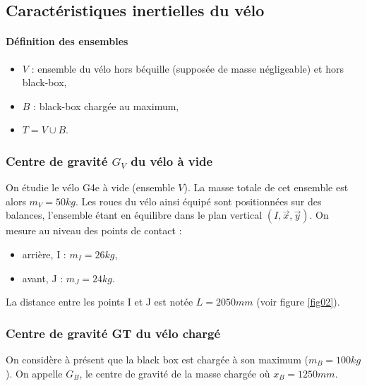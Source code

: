 \subsection{Caractéristiques inertielles du vélo}

\paragraph{Définition des ensembles}
\begin{itemize}
 \item $V$ : ensemble du vélo hors béquille (supposée de masse négligeable) et hors black-box,
 \item $B$ : black-box chargée au maximum,
 \item $T =V \cup B$.
\end{itemize}

\subsubsection{Centre de gravité $G_V$ du vélo à vide}

On étudie le vélo G4e à vide (ensemble $V$). La masse totale de cet ensemble est alors $m_V = 50 kg$. Les roues du vélo ainsi équipé sont positionnées sur des balances, l'ensemble étant en équilibre dans le plan vertical $(I,\vec{x},\vec{y})$. On mesure au niveau des points de contact :
\begin{itemize}
 \item arrière, I : $m_I = 26 kg$,
 \item avant, J : $m_J = 24 kg$.
\end{itemize}

La distance entre les points I et J est notée $L = 2050 mm$ (voir figure \ref{fig02}).


\subsubsection{Centre de gravité GT du vélo chargé}

On considère à présent que la black box est chargée à son maximum ($m_B = 100 kg$). On appelle $G_B$, le centre de gravité de la masse chargée où $x_B = 1250 mm$.


